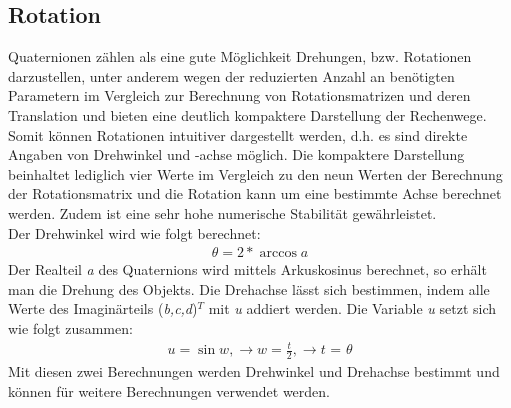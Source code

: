 \subsection{Rotation}
Quaternionen zählen als eine gute Möglichkeit Drehungen, bzw. Rotationen darzustellen, unter anderem wegen der reduzierten Anzahl an 
benötigten Parametern im Vergleich zur Berechnung von Rotationsmatrizen und deren Translation und bieten eine deutlich kompaktere 
Darstellung der Rechenwege. Somit können Rotationen intuitiver dargestellt werden, d.h. es sind direkte Angaben von Drehwinkel und 
-achse möglich. Die kompaktere Darstellung beinhaltet lediglich vier Werte im Vergleich zu den neun Werten der Berechnung der Rotationsmatrix
und die Rotation kann um eine bestimmte Achse berechnet werden. Zudem ist eine sehr hohe numerische Stabilität gewährleistet. 
\\ 
Der Drehwinkel wird wie folgt berechnet:
\begin{align*}
    \textit{$\theta$} = \textit{2} * \textit{$\arccos a$}
\end{align*}
Der Realteil \textit{a} des Quaternions wird mittels Arkuskosinus berechnet, so erhält man die Drehung des Objekts. Die Drehachse lässt sich 
bestimmen, indem alle Werte des Imaginärteils (\textit{b,c,d})$^T$ mit \textit{u} addiert werden. Die Variable \textit{u} setzt sich wie 
folgt zusammen: 
\begin{align*}
    \textit{u} = \textit{$\sin w$}, \to \textit{w} = \frac{t}{2}, \to \textit{t = $\theta$}
\end{align*}
Mit diesen zwei Berechnungen werden Drehwinkel und Drehachse bestimmt und können für weitere Berechnungen verwendet werden.